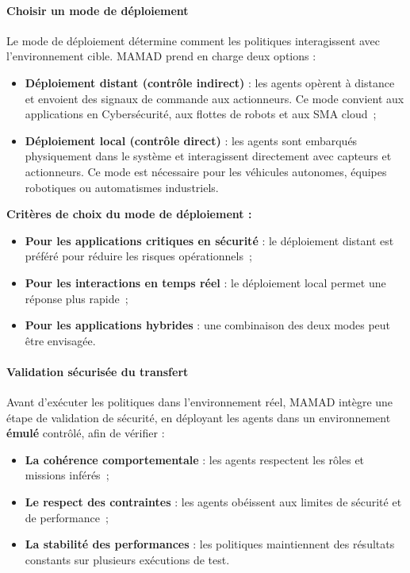 \paragraph{Choisir un mode de déploiement}

Le mode de déploiement détermine comment les politiques interagissent avec l'environnement cible. MAMAD prend en charge deux options :

\begin{itemize}
    \item \textbf{Déploiement distant (contrôle indirect)} : les agents opèrent à distance et envoient des signaux de commande aux actionneurs. Ce mode convient aux applications en Cybersécurité, aux flottes de robots et aux SMA cloud~;

    \item \textbf{Déploiement local (contrôle direct)} : les agents sont embarqués physiquement dans le système et interagissent directement avec capteurs et actionneurs. Ce mode est nécessaire pour les véhicules autonomes, équipes robotiques ou automatismes industriels.
\end{itemize}

\vspace{0.4em}
\noindent \textbf{Critères de choix du mode de déploiement :}
\begin{itemize}
    \item \textbf{Pour les applications critiques en sécurité} : le déploiement distant est préféré pour réduire les risques opérationnels~;
    \item \textbf{Pour les interactions en temps réel} : le déploiement local permet une réponse plus rapide~;
    \item \textbf{Pour les applications hybrides} : une combinaison des deux modes peut être envisagée.
\end{itemize}

\paragraph{Validation sécurisée du transfert}

Avant d'exécuter les politiques dans l'environnement réel, MAMAD intègre une étape de validation de sécurité, en déployant les agents dans un environnement \textbf{émulé} contrôlé, afin de vérifier :

\begin{itemize}
    \item \textbf{La cohérence comportementale} : les agents respectent les rôles et missions inférés~;
    \item \textbf{Le respect des contraintes} : les agents obéissent aux limites de sécurité et de performance~;
    \item \textbf{La stabilité des performances} : les politiques maintiennent des résultats constants sur plusieurs exécutions de test.
\end{itemize}

